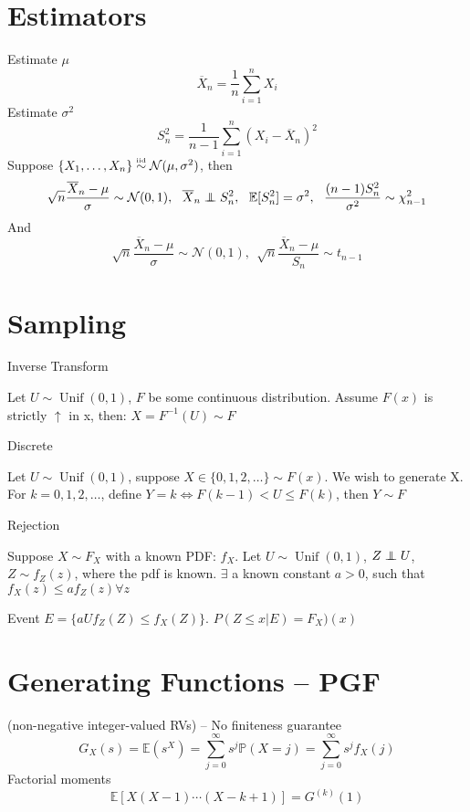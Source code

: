 \documentclass[twocolumn]{amsart}
\newcommand{\E}{\mathbb{E}}
\renewcommand{\P}{\mathbb{P}}
\newcommand{\Unif}{\operatorname{Unif}}
\newcommand\iid{\mathrel{\overset{\makebox[0pt]{\mbox{\normalfont\tiny iid}}}{\sim}}}
\newcommand\independent{\protect\mathpalette{\protect\independenT}{\perp}}
\def\independenT#1#2{\mathrel{\rlap{$#1#2$}\mkern3mu{#1#2}}}
\begin{document}
\section{Estimators}
Estimate $\mu$
\begin{equation*}
  \overline{X}_{n} = \frac{1}{n}\sum_{i=1}^{n}X_{i}
\end{equation*}
Estimate $\sigma^{2}$
\begin{equation*}
  S_{n}^{2} = \frac{1}{n-1}\sum_{i=1}^{n}(X_{i}-\overline{X}_{n})^{2}
\end{equation*}
Suppose $\{X_{1},\ldots,X_{n}\}\iid\mathcal{N}(\mu,\sigma^{2})$, then
\begin{equation*}
  \sqrt{n}\frac{\overline{X}_{n} - \mu}{\sigma}\sim\mathcal{N}(0,1),~~
  \overline{X}_{n}\independent S_{n}^{2},~~
  \E[S_{n}^{2}] = \sigma^{2},~~\frac{(n-1)S_{n}^{2}}{\sigma^{2}}\sim \chi^{2}_{n-1}
\end{equation*}
And
\begin{equation*}
  \sqrt{n}\frac{\overline{X}_{n} - \mu}{\sigma}\sim \mathcal{N}(0,1),~~
  \sqrt{n}\frac{\overline{X}_{n} - \mu}{S_{n}}\sim t_{n-1}
\end{equation*}

\section{Sampling}
Inverse Transform

Let $U\sim\Unif(0, 1)$, $F$ be some continuous distribution. Assume $F(x)$ is strictly
$\uparrow$ in x, then: $X=F^{-1}(U)\sim F$

Discrete

Let $U\sim\Unif(0, 1)$, suppose $X\in\{0,1,2,\ldots\} \sim F(x)$. We wish to
generate X. For $k=0,1,2,\ldots$, define $Y=k\iff F(k-1)<U\leq F(k)$, then
$Y\sim F$

Rejection

Suppose $X\sim F_{X}$ with a known PDF: $f_{X}$. Let $U\sim\Unif(0,1)$,
$Z\independent U$, $Z\sim f_{Z}(z)$, where the pdf is known. $\exists$ a known
constant $a > 0$, such that $f_{X}(z)\leq a f_{Z}(z) \forall z$

Event $E=\{aUf_{Z}(Z)\leq f_{X}(Z)\}$. $P(Z\leq x | E) = F_{X})(x)$


\section{Generating Functions -- PGF}
(non-negative integer-valued RVs) -- No finiteness guarantee
\begin{equation*}
  G_{X}(s) = \E(s^{X}) = \sum_{j=0}^{\infty}s^{j}\P(X=j) = \sum_{j=0}^{\infty}s^{j}f_{X}(j)
\end{equation*}
Factorial moments
\begin{equation*}
  \E[X(X-1)\cdots(X-k+1)] = G^{(k)}(1)
\end{equation*}
\end{document}
